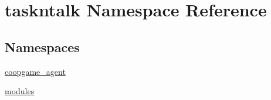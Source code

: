 \hypertarget{namespacetaskntalk}{}\section{taskntalk Namespace Reference}
\label{namespacetaskntalk}
\subsection*{Namespaces}
\begin{DoxyCompactItemize}
\item 
 \hyperlink{namespacetaskntalk_1_1coopgame__agent}{coopgame\+\_\+agent}
\item 
 \hyperlink{namespacetaskntalk_1_1modules}{modules}
\end{DoxyCompactItemize}
